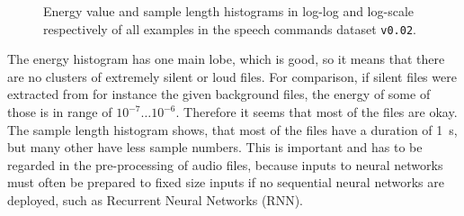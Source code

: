 \begin{figure}[!ht]
  \centering
  \caption{Energy value and sample length histograms in log-log and log-scale respectively of all examples in the speech commands dataset \texttt{v0.02}.}
  \label{fig:exp_dataset_hist}
\end{figure}
\FloatBarrier
\noindent
The energy histogram has one main lobe, which is good, so it means that there are no clusters of extremely silent or loud files.
For comparison, if silent files were extracted from for instance the given background files, the energy of some of those is in range of $10^{-7} \dots 10^{-6}$. Therefore it seems that most of the files are okay.
The sample length histogram shows, that most of the files have a duration of \SI{1}{\second}, but many other have less sample numbers. 
This is important and has to be regarded in the pre-processing of audio files, because inputs to neural networks must often be prepared to fixed size inputs if no sequential neural networks are deployed, such as Recurrent Neural Networks (RNN).



